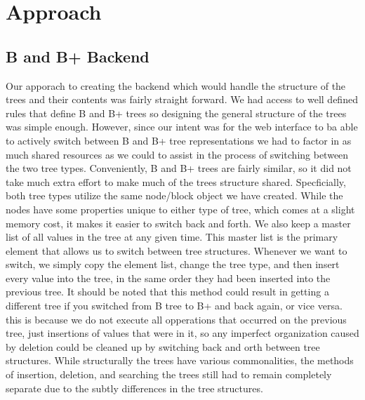 \section{Approach}

\subsection{B and B+ Backend}
    Our apporach to creating the backend which would handle the structure 
of the trees and their contents was fairly straight forward.  We had access to
well defined rules that define B and B+ trees so designing the general structure 
of the trees was simple enough.  However, since our intent was for the web interface 
to ba able to actively switch between B and B+ tree representations we had to factor 
in as much shared resources as we could to assist in the process of switching between 
the two tree types.  Conveniently, B and B+ trees are fairly similar, so it did not take
much extra effort to make much of the trees structure shared.  Specficially, both tree types
utilize the same node/block object we have created.  While the nodes have some properties 
unique to either type of tree, which comes at a slight memory cost, it makes it easier to 
switch back and forth.  We also keep a master list of all values in the tree at any given time.
This master list is the primary element that allows us to switch between tree structures.
Whenever we want to switch, we simply copy the element list, change the tree type, and then 
insert every value into the tree, in the same order they had been inserted into the previous 
tree.  It should be noted that this method could result in getting a different tree if you switched 
from B tree to B+ and back again, or vice versa.  this is because we do not execute all opperations 
that occurred on the previous tree, just insertions of values that were in it, so any imperfect 
organization caused by deletion could be cleaned up by switching back and orth between tree structures.
While structurally the trees have various commonalities, the methods of insertion, deletion, and searching 
the trees still had to remain completely separate due to the subtly differences in the tree structures.


